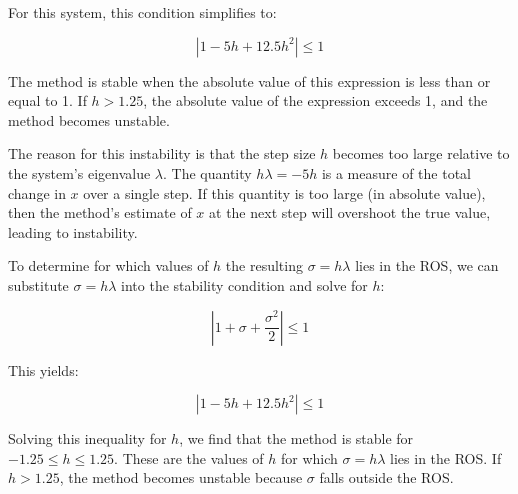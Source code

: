 \documentclass[11pt]{article}
\begin{document}
\begin{question}
{		For this system, this condition simplifies to:
		
		\begin{equation}
		|1 - 5h + 12.5h^2| \leq 1
		\end{equation}
		
		The method is stable when the absolute value of this expression is less than or equal to 1. If $h > 1.25$, the absolute value of the expression exceeds 1, and the method becomes unstable.
		
		The reason for this instability is that the step size $h$ becomes too large relative to the system's eigenvalue $\lambda$. The quantity $h\lambda = -5h$ is a measure of the total change in $x$ over a single step. If this quantity is too large (in absolute value), then the method's estimate of $x$ at the next step will overshoot the true value, leading to instability.
		
		To determine for which values of $h$ the resulting $\sigma = h\lambda$ lies in the ROS, we can substitute $\sigma = h\lambda$ into the stability condition and solve for $h$:
		
		\begin{equation}
		|1 + \sigma + \frac{\sigma^2}{2}| \leq 1
		\end{equation}
		
		This yields:
		
		\begin{equation}
		|1 - 5h + 12.5h^2| \leq 1
		\end{equation}
		
		Solving this inequality for $h$, we find that the method is stable for $-1.25 \leq h \leq 1.25$. These are the values of $h$ for which $\sigma = h\lambda$ lies in the ROS. If $h > 1.25$, the method becomes unstable because $\sigma$ falls outside the ROS.

	}

\end{question}
\end{document}
